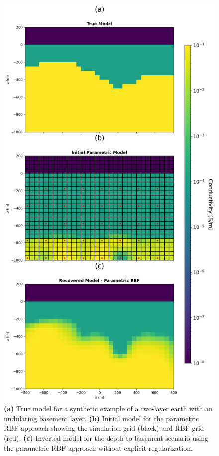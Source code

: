 \documentclass{segabs}
\begin{document}
\begin{figure}[h]
    \centering
    \includegraphics[width=\columnwidth]{figures/d2b_all_3_title_v2.png}
    \caption{ \textbf{(a)} True model for a synthetic example of a two-layer earth with an undulating basement layer. \textbf{(b)} Initial model for the parametric RBF approach showing the simulation grid (black) and RBF grid (red). \textbf{(c)} Inverted model for the depth-to-basement scenario using the parametric RBF approach without explicit regularization.}
    \label{fig:d2b}
\end{figure}
\end{document}
